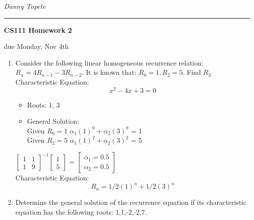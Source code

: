 \documentclass[11pt]{article}
\newcommand{\student}[1]{{\noindent\Large\em {#1} \hfill}\vskip 0.1in}
\newcommand{\assignment}[1]{\centerline{\large\bf CS111 Homework {#1}}}
\newcommand{\duedate}[1]{{\centerline{due {#1}}}}
\newcounter{prnum}
\newenvironment{problem}{{\vskip 0.2in\noindent\bf Problem
       \addtocounter{prnum}{1} \arabic{prnum}.}}{\vskip 0.1in}
\begin{document}
\student{Danny Topete} %
\vskip 0.1in\noindent\hrule\vskip 0.2in
\assignment{2}                           %
\duedate{Monday, Nov 4th}              %


\begin{problem}
\begin{enumerate}[label=\alph*)]
    \item Consider the following linear homogeneous recurrence relation: $R_n = 4R_{n-1} - 3R_{n-2}.$
      It is known that: $R_0 = 1, R_2 = 5$. Find $R_3$\\

      Characteristic Equation: 
      \begin{equation}
        x^2 - 4x + 3 = 0
      \end{equation}
      \begin{itemize}
        \item Roots: 1, 3
        \item General Solution: \\
         Given $R_0 = 1$ \Rightarrow $\alpha_1(1)^0 + \alpha_2(3)^0$ = 1\\
         Given $R_2 = 5$ \Rightarrow $\alpha_1(1)^2 + \alpha_2(3)^2$ = 5


      \end{itemize}

        $\begin{bmatrix} 1 & 1 \\ 1 & 9 \end{bmatrix}^{-1} \begin{bmatrix} 1 \\ 5 \end{bmatrix}$ = 
        $\begin{bmatrix} \alpha_1 = 0.5\\ \alpha_2 = 0.5 \end{bmatrix}$\\

      Characteristic Equation: 
      \begin{equation}
        R_n = 1/2 (1)^n + 1/2 (3)^n
      \end{equation}

    \item Determine the general solution of the recurrence equation if its characteristic
      equation has the following roots: 1,1,-2,-2,7.\\



\end{enumerate}
\end{problem}
\end{document}
